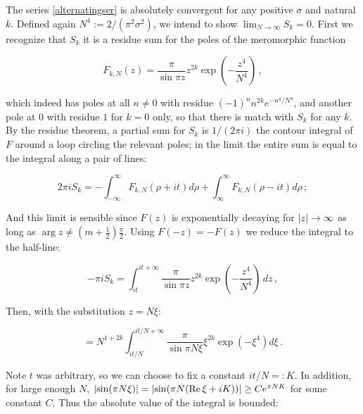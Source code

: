 \documentclass{article}
\begin{document}
The series \eqref{alternatingser} is absolutely convergent for any positive $\sigma$ and natural $k$. Defined again $N^4 := 2/(\pi^2 \sigma^2)$, we intend to show  $\lim_{N \rightarrow \infty} S_k = 0$. First we recognize that $S_k$ it is a residue sum for the poles of the meromorphic function

\begin{equation}
    F_{k,N}(z) = \frac{\pi}{\sin{\pi z}} z^{2k} \exp(-\frac{z^4}{N^4})\,,
\end{equation}



which indeed has poles at all $n \neq 0$ with residue $(-1)^n n^{2k} e^{-n^4/N^4}$, and another pole at $0$ with residue $1$ for $k=0$ only, so that there is match with $S_k$ for any $k$. By the residue theorem, a partial sum for $S_k$ is $1/(2\pi i)$ the contour integral of $F$ around a loop circling the relevant poles; in the limit the entire sum is equal to the integral along a pair of lines:

\begin{equation}
    2\pi i S_k = -\int_{-\infty}^\infty F_{k,N}(\rho + it) d\rho + \int_\infty^\infty F_{k,N}(\rho-it)d\rho\,;
\end{equation}

And this limit is sensible since $F(z)$ is exponentially decaying for $\abs{z} \rightarrow \infty$ as long as $\arg{z} \neq (m+\frac{1}{2}) \frac{\pi}{2}$. Using $F(-z) = - F(z)$ we reduce the integral to the half-line:

\begin{equation}
    - \pi i S_k = \int_{it}^{it + \infty} \frac{\pi}{\sin{\pi z}} z^{2k} \exp(-\frac{z^4}{N^4})\,dz\,,
\end{equation}

Then, with the substitution $z = N \xi$:

\begin{equation}
    = N^{1+2k} \int_{it/N}^{it/N + \infty} \frac{\pi}{\sin{\pi N \xi}} \xi^{2k} \exp(-\xi^4) d\xi\,.
\end{equation}

Note $t$ was arbitrary, so we can choose to fix a constant $it/N =: K$. In addition, for large enough $N$, $\abs{\sin(\pi N \xi)} = \abs{\sin(\pi N (\Re \xi + iK))} \geq C e^{\pi N K}$ for some constant $C$. Thus the absolute value of the integral is bounded:
\end{document}
